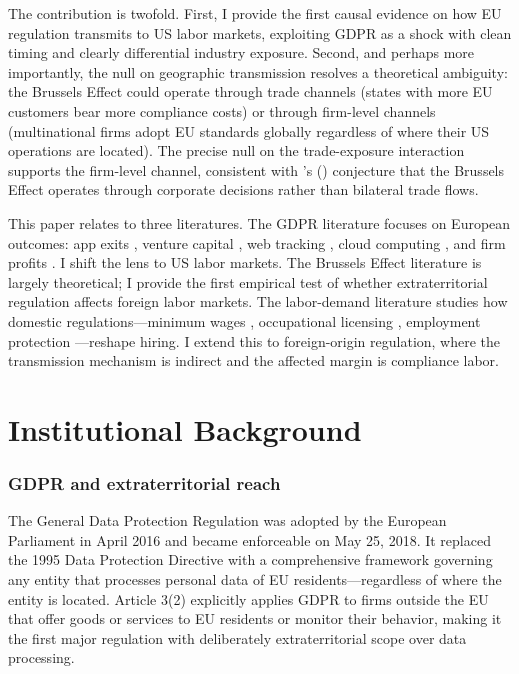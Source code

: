 \documentclass[12pt]{article}
\begin{document}
The contribution is twofold. First, I provide the first causal evidence on how EU regulation transmits to US labor markets, exploiting GDPR as a shock with clean timing and clearly differential industry exposure. Second, and perhaps more importantly, the null on geographic transmission resolves a theoretical ambiguity: the Brussels Effect could operate through trade channels (states with more EU customers bear more compliance costs) or through firm-level channels (multinational firms adopt EU standards globally regardless of where their US operations are located). The precise null on the trade-exposure interaction supports the firm-level channel, consistent with \citeauthor{Bradford2020}'s (\citeyear{Bradford2020}) conjecture that the Brussels Effect operates through corporate decisions rather than bilateral trade flows.

This paper relates to three literatures. The GDPR literature focuses on European outcomes: app exits \citep{Zhuo2021}, venture capital \citep{Johnson2024}, web tracking \citep{Goldberg2024}, cloud computing \citep{Gal2023}, and firm profits \citep{Chen2022}. I shift the lens to US labor markets. The Brussels Effect literature \citep{Bradford2020, Vogel2012, DeSombre2000} is largely theoretical; I provide the first empirical test of whether extraterritorial regulation affects foreign labor markets. The labor-demand literature studies how domestic regulations---minimum wages \citep{Dube2010}, occupational licensing \citep{Kleiner2013}, employment protection \citep{Autor2006}---reshape hiring. I extend this to foreign-origin regulation, where the transmission mechanism is indirect and the affected margin is compliance labor.

\section{Institutional Background}

\subsubsection*{GDPR and extraterritorial reach} The General Data Protection Regulation was adopted by the European Parliament in April 2016 and became enforceable on May 25, 2018. It replaced the 1995 Data Protection Directive with a comprehensive framework governing any entity that processes personal data of EU residents---regardless of where the entity is located. Article 3(2) explicitly applies GDPR to firms outside the EU that offer goods or services to EU residents or monitor their behavior, making it the first major regulation with deliberately extraterritorial scope over data processing.
\end{document}
